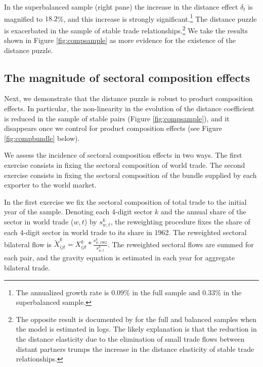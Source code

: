 \documentclass[12pt,twoside,a4paper,notitlepage]{article}
\begin{document}
In the superbalanced sample (right pane) the increase in the distance effect $\delta_t$ is magnified to $18.2$\%, and this increase is strongly significant.\footnote{The annualized growth rate is 0.09\% in the full sample and 0.33\% in the superbalanced sample.}
The distance puzzle is exacerbated in the sample of stable trade relationships.\footnote{The opposite result is documented by \cite{Head2013} for the full and balanced samples when the model is estimated in logs. The likely explanation is that the reduction 
in the distance elasticity due to the elimination of small trade flows between distant partners trumps the increase in the distance elasticity of stable trade relationships.}
We take the results shown in Figure \ref{fig:compsample} as more evidence for the existence of the distance puzzle. 

\subsection{The magnitude of sectoral composition effects} \label{subsec:robustpuzzle}
Next, we demonstrate that the distance puzzle is robust to product composition effects.
In particular, the non-linearity in the evolution of the distance coefficient  is reduced in the sample of stable pairs (Figure \ref{fig:compsample}), and it \fi disappears once we control for product composition effects (see Figure \ref{fig:compbundle} below).

We assess the incidence of sectoral composition effects in two ways.
The first exercise consists in fixing the sectoral composition of world trade.
The second exercise consists in fixing the sectoral composition of the bundle supplied by each exporter to the world market.


In the first exercise we fix the sectoral composition of total trade to the initial year of the sample.
Denoting each 4-digit sector $k$ and the annual share of the sector in world trade ($w,t$) by $s^{k}_{w,t}$, the reweighting procedure fixes the share of each 4-digit sector in world trade to its share in 1962.
The reweighted sectoral bilateral flow is $\tilde{X}^k_{ijt}=X^k_{ijt}*\frac{s^k_{w,1962}}{s^k_{w,t}}$.
The reweighted sectoral flows are summed for each pair, and the gravity equation is estimated in each year for aggregate bilateral trade.
\end{document}
